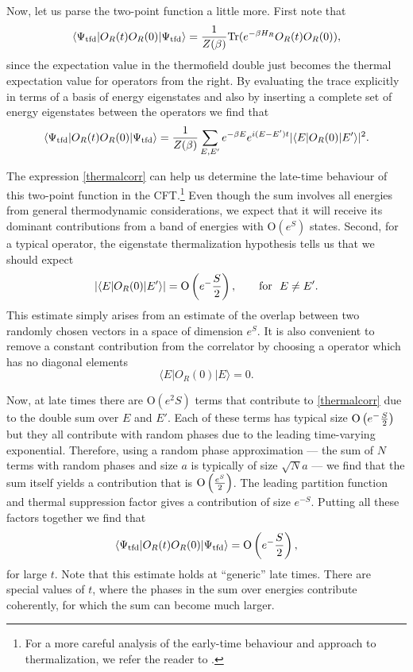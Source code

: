 \documentclass[12pt]{article}
\newcommand{\tfd}{\Psi_{\text{tfd}}} %
\def\tr{{\rm Tr}}
\def\Or[#1]{{\text{O}}\left({#1}\right)}
\newcommand{\be}{\begin{equation}}
\newcommand{\ee}{\end{equation}}
\begin{document}
Now, let us parse the two-point function a little more. First note that
\be
\langle \tfd | O_R(t) O_R(0) | \tfd \rangle = {1 \over Z(\beta)} \tr(e^{-\beta H_R} O_R(t) O_R(0)),
\ee
since the expectation value in the thermofield double just becomes the thermal expectation value
for operators from the right. By evaluating the trace explicitly in terms of a basis of energy eigenstates and also by inserting a complete
set of energy eigenstates between the operators we find that
\be
\label{thermalcorr}
\langle \tfd | O_R(t) O_R(0) | \tfd \rangle = {1 \over Z(\beta)} \sum_{E, E'} e^{-\beta E} e^{i (E - E') t} |\langle E| O_R(0) | E' \rangle|^2.
\ee

The expression \eqref{thermalcorr} can help us determine the late-time behaviour of this two-point function in the CFT.\footnote{For a more careful analysis of the early-time behaviour and approach to thermalization, we refer the reader to \cite{Banerjee:2019ilw,Mandal:2015kxi,Kulkarni:2018ahv}.} Even though the sum involves all energies from general thermodynamic considerations, we expect that it will receive its dominant contributions from a band of energies with $\Or[e^{S}]$ states.  Second, for a typical operator, the eigenstate thermalization hypothesis \cite{srednicki1994chaos,srednicki1999approach} tells us that we should expect
\be
|\langle E| O_R(0) | E' \rangle| = \Or[e^{-{S \over 2}}], \qquad \text{for}~~E \neq E'.
\ee
This estimate simply arises from an estimate of the overlap between two randomly chosen vectors in a space of dimension $e^{S}$.
It is also convenient to remove a constant contribution from the correlator by choosing a operator which has no diagonal elements
\be
\langle E| O_R(0) | E \rangle = 0.
\ee

Now, at late times there are $\Or[e^{2 S}]$ terms that contribute to \eqref{thermalcorr} due to the double sum over $E$ and $E'$. Each of these terms has typical size $\Or[e^{-{S \over 2}}]$ but they all contribute with random phases due to the leading time-varying exponential. Therefore, using a random phase approximation --- the sum of $N$ terms with random phases and size $a$ is typically of size $\sqrt{N} a$ --- we find that the sum itself yields a contribution that is $\Or[e^{S \over 2}]$.  The leading partition function and thermal suppression factor gives a contribution of size $e^{-S}$. Putting all these factors together we find that
\be
\label{longtimetwopt}
\langle \tfd | O_R(t) O_R(0) | \tfd \rangle  = \Or[e^{-{S \over 2}}],
\ee
for large $t$. Note that this estimate holds at ``generic'' late times. There are special values of $t$, where the phases in the sum over energies contribute coherently, for which the sum can become much larger.
\end{document}
